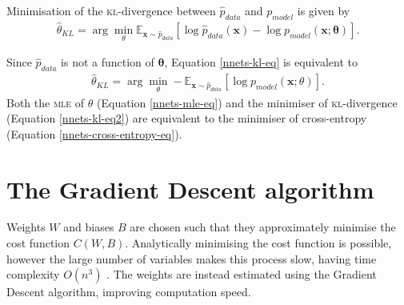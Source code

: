 Minimisation of the \textsc{kl}-divergence between $\hat{p}_{data}$ and $p_{model}$ is given by
\begin{align}\label{nnets-kl-eq}
	\hat{\theta}_{KL} = \arg\min_\theta\mathbb{E}_{\mathbf{x}\sim\hat{p}_{data}}\left[\log \hat{p}_{data}(\mathbf{x}) - \log p_{model}(\mathbf{x};\mathbf{\theta})\right].
\end{align}

Since $\hat{p}_{data}$ is not a function of $\mathbf{\theta}$, Equation \eqref{nnets-kl-eq} is equivalent to 
\begin{align}\label{nnets-kl-eq2}
	\hat\theta_{KL} = \arg\min_\theta-\mathbb{E}_{\mathbf{x}\sim\hat{p}_{data}}\left[\log p_{model}(\mathbf{x};\theta)\right].
\end{align}
Both the \textsc{mle} of $\theta$ (Equation \eqref{nnets-mle-eq}) and the minimiser of \textsc{kl}-divergence (Equation \eqref{nnets-kl-eq2}) are equivalent to the minimiser of cross-entropy (Equation \eqref{nnets-cross-entropy-eq}). 






\section{The Gradient Descent algorithm}\label{nnets-graddesc}

Weights $W$ and biases $B$ are chosen such that they approximately minimise the cost function $C(W,B)$. Analytically minimising the cost function is possible, however the large number of variables makes this process slow, having time complexity $O(n^3)$ \citep{Marquardt1963}. The weights are instead estimated using the Gradient Descent algorithm, improving computation speed.

